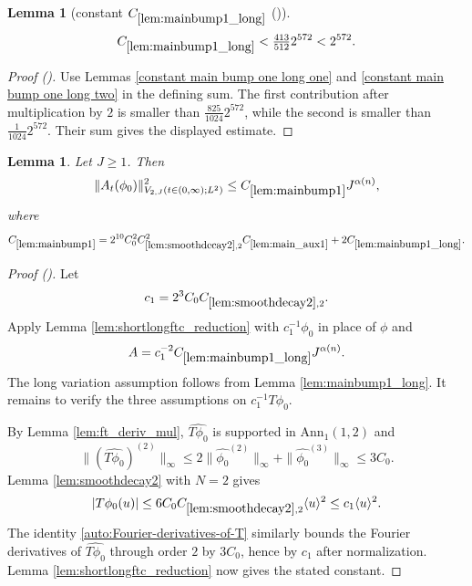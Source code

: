 \documentclass[12pt,reqno]{amsart}
\newcommand{\auto}{{({\tiny\faCar})}}
\theoremstyle{plain}
\newtheorem{lemma}[theorem]{Lemma}
\numberwithin{equation}{section}
\theoremstyle{remark}
\newcommand{\using}[1]{}
\begin{document}
\begin{lemma}[constant $C_{\ref{lem:mainbump1_long}}$ \auto]\label{constant main bump one long}\using{constant main bump one long one}\using{constant main bump one long two}\using{lem:mainbump1_long}
\begin{equation}\label{constant main bump one long bound}
C_{\ref{lem:mainbump1_long}}<\tfrac{413}{512}2^{572}<2^{572}.
\end{equation}
\end{lemma}
\begin{proof}[Proof \auto]
Use Lemmas \ref{constant main bump one long one} and \ref{constant main bump one long two} in the defining sum. The first contribution after multiplication by $2$ is smaller than $\frac{825}{1024}2^{572}$, while the second is smaller than $\frac1{1024}2^{572}$. Their sum gives the displayed estimate.
\end{proof}

\begin{lemma}\label{lem:mainbump1}\using{lem:smoothdecay2}\using{lem:shortlongftc_reduction}\using{lem:mainbump1_long}\using{lem:ft_deriv_mul}
Let $J\ge1$. Then
\begin{equation}\label{mainbump1}
\|A_t(\phi_0)\|_{V_{2,J}(t\in(0,\infty);L^2)}^2
\le C_{\ref{lem:mainbump1}}J^{\alpha(n)},
\end{equation}
where
\begin{equation}\label{auto:main-bump-one-constant-definition}
C_{\ref{lem:mainbump1}}
=2^{10}C_0^2C_{\ref{lem:smoothdecay2},2}^2C_{\ref{lem:main_aux1}}
+2C_{\ref{lem:mainbump1_long}}.
\end{equation}
\end{lemma}

\begin{proof}[Proof \auto]
Let
\[
c_1=2^3C_0C_{\ref{lem:smoothdecay2},2}.
\]
Apply Lemma \ref{lem:shortlongftc_reduction} with $c_1^{-1}\phi_0$ in place of $\phi$ and
\[
A=c_1^{-2}C_{\ref{lem:mainbump1_long}}J^{\alpha(n)}.
\]
The long variation assumption follows from Lemma \ref{lem:mainbump1_long}. It remains to verify the three assumptions on $c_1^{-1}T\phi_0$.

By Lemma \ref{lem:ft_deriv_mul}, $\widehat{T\phi_0}$ is supported in $\mathrm{Ann}_1(1,2)$ and
\[
\|(\widehat{T\phi_0})^{(2)}\|_\infty
\le2\|\widehat{\phi_0}^{(2)}\|_\infty
+\|\widehat{\phi_0}^{(3)}\|_\infty
\le3C_0.
\]
Lemma \ref{lem:smoothdecay2} with $N=2$ gives
\[
|T\phi_0(u)|
\le6C_0C_{\ref{lem:smoothdecay2},2}\langle u\rangle^2
\le c_1\langle u\rangle^2.
\]
The identity \eqref{auto:Fourier-derivatives-of-T} similarly bounds the Fourier derivatives of $\widehat{T\phi_0}$ through order $2$ by $3C_0$, hence by $c_1$ after normalization. Lemma \ref{lem:shortlongftc_reduction} now gives the stated constant.
\end{proof}
\end{document}
